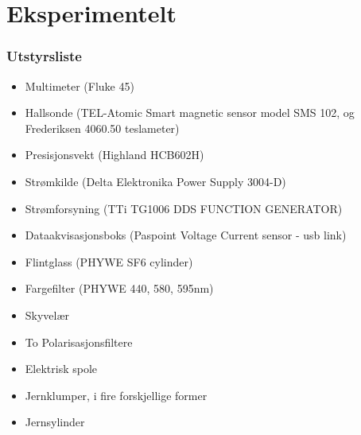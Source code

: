 \documentclass[%
 reprint,
 amsmath,amssymb,
 aps,
 norsk,
]{revtex4-1}
\begin{document}
\section{Eksperimentelt}
\subsubsection*{Utstyrsliste}
\begin{itemize}
  \item Multimeter (Fluke 45)
  \item Hallsonde (TEL-Atomic Smart magnetic sensor model SMS 102, og Frederiksen 4060.50 teslameter)
  \item Presisjonsvekt (Highland HCB602H)
  \item Strømkilde (Delta Elektronika Power Supply 3004-D)
  \item Strømforsyning (TTi TG1006 DDS FUNCTION GENERATOR)
  \item Dataakvisasjonsboks (Paspoint Voltage Current sensor - usb link)
  \item Flintglass (PHYWE SF6 cylinder)
  \item Fargefilter (PHYWE 440, 580, 595nm)
  \item Skyvelær
  \item To Polarisasjonsfiltere
  \item Elektrisk spole
  \item Jernklumper, i fire forskjellige former
  \item Jernsylinder
\end{itemize}
\end{document}
